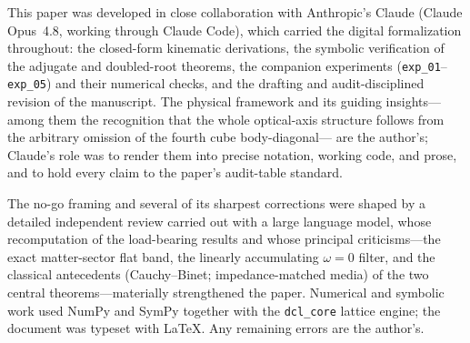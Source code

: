 
This paper was developed in close collaboration with Anthropic's Claude (Claude
Opus~4.8, working through Claude Code), which carried the digital formalization
throughout: the closed-form kinematic derivations, the symbolic verification of
the adjugate and doubled-root theorems, the companion experiments
(\texttt{exp\_01}--\texttt{exp\_05}) and their numerical checks, and the drafting
and audit-disciplined revision of the manuscript. The physical framework and its
guiding insights---among them the recognition that the whole optical-axis
structure follows from the arbitrary omission of the fourth cube body-diagonal---%
are the author's; Claude's role was to render them into precise notation, working
code, and prose, and to hold every claim to the paper's audit-table standard.

The no-go framing and several of its sharpest corrections were shaped by a
detailed independent review carried out with a large language model, whose
recomputation of the load-bearing results and whose principal criticisms---the
exact matter-sector flat band, the linearly accumulating $\omega=0$ filter, and
the classical antecedents (Cauchy--Binet; impedance-matched media) of the two
central theorems---materially strengthened the paper. Numerical and symbolic work
used NumPy and SymPy together with the \texttt{dcl\_core} lattice engine; the
document was typeset with \LaTeX. Any remaining errors are the author's.
